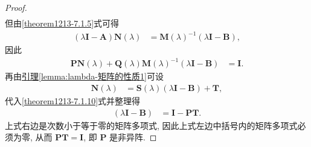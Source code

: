 \documentclass[../../main.tex]{subfiles}
\begin{document}
\begin{proof}
\begin{align*}
\end{align*}
但由\eqref{theorem1213-7.1.5}式可得
\begin{align*}
(\lambda\boldsymbol{I}-\boldsymbol{A})\boldsymbol{N}(\lambda)&=\boldsymbol{M}(\lambda)^{-1}(\lambda\boldsymbol{I}-\boldsymbol{B}),
\end{align*}
因此
\begin{align}
\boldsymbol{P}\boldsymbol{N}(\lambda)+\boldsymbol{Q}(\lambda)\boldsymbol{M}(\lambda)^{-1}(\lambda\boldsymbol{I}-\boldsymbol{B})&=\boldsymbol{I}. \label{theorem1213-7.1.10}
\end{align}
再由\hyperref[lemma:lambda-矩阵的性质1]{引理\ref{lemma:lambda-矩阵的性质1}}可设
\begin{align*}
\boldsymbol{N}(\lambda)&=\boldsymbol{S}(\lambda)(\lambda\boldsymbol{I}-\boldsymbol{B})+\boldsymbol{T},
\end{align*}
代入\eqref{theorem1213-7.1.10}式并整理得
\begin{align*}
[\boldsymbol{P}\boldsymbol{S}(\lambda)+\boldsymbol{Q}(\lambda)\boldsymbol{M}(\lambda)^{-1}](\lambda\boldsymbol{I}-\boldsymbol{B})&=\boldsymbol{I}-\boldsymbol{P}\boldsymbol{T}.
\end{align*}
上式右边是次数小于等于零的矩阵多项式, 因此上式左边中括号内的矩阵多项式必须为零, 从而 $\boldsymbol{P}\boldsymbol{T}=\boldsymbol{I}$, 即 $\boldsymbol{P}$ 是非异阵.
\end{proof}
\end{document}
